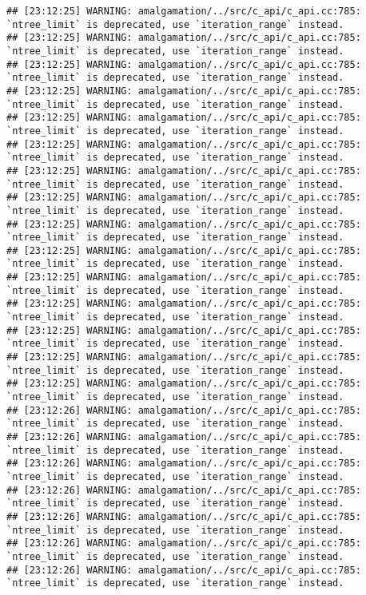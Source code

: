 \documentclass[
]{article}
\begin{document}
\begin{verbatim}
## [23:12:25] WARNING: amalgamation/../src/c_api/c_api.cc:785: `ntree_limit` is deprecated, use `iteration_range` instead.
## [23:12:25] WARNING: amalgamation/../src/c_api/c_api.cc:785: `ntree_limit` is deprecated, use `iteration_range` instead.
## [23:12:25] WARNING: amalgamation/../src/c_api/c_api.cc:785: `ntree_limit` is deprecated, use `iteration_range` instead.
## [23:12:25] WARNING: amalgamation/../src/c_api/c_api.cc:785: `ntree_limit` is deprecated, use `iteration_range` instead.
## [23:12:25] WARNING: amalgamation/../src/c_api/c_api.cc:785: `ntree_limit` is deprecated, use `iteration_range` instead.
## [23:12:25] WARNING: amalgamation/../src/c_api/c_api.cc:785: `ntree_limit` is deprecated, use `iteration_range` instead.
## [23:12:25] WARNING: amalgamation/../src/c_api/c_api.cc:785: `ntree_limit` is deprecated, use `iteration_range` instead.
## [23:12:25] WARNING: amalgamation/../src/c_api/c_api.cc:785: `ntree_limit` is deprecated, use `iteration_range` instead.
## [23:12:25] WARNING: amalgamation/../src/c_api/c_api.cc:785: `ntree_limit` is deprecated, use `iteration_range` instead.
## [23:12:25] WARNING: amalgamation/../src/c_api/c_api.cc:785: `ntree_limit` is deprecated, use `iteration_range` instead.
## [23:12:25] WARNING: amalgamation/../src/c_api/c_api.cc:785: `ntree_limit` is deprecated, use `iteration_range` instead.
## [23:12:25] WARNING: amalgamation/../src/c_api/c_api.cc:785: `ntree_limit` is deprecated, use `iteration_range` instead.
## [23:12:25] WARNING: amalgamation/../src/c_api/c_api.cc:785: `ntree_limit` is deprecated, use `iteration_range` instead.
## [23:12:25] WARNING: amalgamation/../src/c_api/c_api.cc:785: `ntree_limit` is deprecated, use `iteration_range` instead.
## [23:12:25] WARNING: amalgamation/../src/c_api/c_api.cc:785: `ntree_limit` is deprecated, use `iteration_range` instead.
## [23:12:26] WARNING: amalgamation/../src/c_api/c_api.cc:785: `ntree_limit` is deprecated, use `iteration_range` instead.
## [23:12:26] WARNING: amalgamation/../src/c_api/c_api.cc:785: `ntree_limit` is deprecated, use `iteration_range` instead.
## [23:12:26] WARNING: amalgamation/../src/c_api/c_api.cc:785: `ntree_limit` is deprecated, use `iteration_range` instead.
## [23:12:26] WARNING: amalgamation/../src/c_api/c_api.cc:785: `ntree_limit` is deprecated, use `iteration_range` instead.
## [23:12:26] WARNING: amalgamation/../src/c_api/c_api.cc:785: `ntree_limit` is deprecated, use `iteration_range` instead.
## [23:12:26] WARNING: amalgamation/../src/c_api/c_api.cc:785: `ntree_limit` is deprecated, use `iteration_range` instead.
## [23:12:26] WARNING: amalgamation/../src/c_api/c_api.cc:785: `ntree_limit` is deprecated, use `iteration_range` instead.

\end{verbatim}
\end{document}
